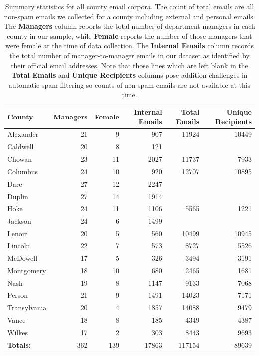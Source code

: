 \documentclass[fleqn]{MJDArticle}
\begin{document}
\begin{table}[ht]
\caption{\label{tab:county email summaries} Summary statistics for all county email corpora. The count of total emails are all non-spam emails we collected for a county including external and personal emails. The \textbf{Managers} column reports the total number of department managers in each county in our sample, while \textbf{Female} reports the number of those managers that were female at the time of data collection. The \textbf{Internal Emails} column records the total number of manager-to-manager emails in our dataset as identified by their official email addresses. Note that those lines which are left blank in the \textbf{Total Emails} and \textbf{Unique Recipients} columns pose addition challenges in automatic spam filtering so counts of non-spam emails are not available at this time.  }
\centering
\begin{tabular}{lrrrrr}
  \hline
 \textbf{County} & \textbf{Managers} & \textbf{Female} & \textbf{Internal Emails} &\textbf{Total Emails} & \textbf{Unique Recipients} \\
  \hline
  \rowcolor{Grey}
Alexander & 21 & 9 & 907 & 11924 & 10449 \\
Caldwell & 20 & 8 & 121 &  &  \\
\rowcolor{Grey}
Chowan & 23 & 11 & 2027 & 11737 & 7933 \\
Columbus & 24 & 10 & 920 & 12707 & 10895 \\
\rowcolor{Grey}
Dare & 27 & 12 & 2247 &  &  \\
Duplin & 27 & 14 & 1914 &  &  \\
\rowcolor{Grey}
Hoke & 24 & 11 & 1106 & 5565 & 1221 \\
Jackson & 24 & 6 & 1499 &  &  \\
\rowcolor{Grey}
Lenoir & 20 & 5 & 560 & 10499 & 10945 \\
Lincoln & 22 & 7 & 573 & 8727 & 5526 \\
\rowcolor{Grey}
McDowell & 17 & 5 & 326 & 3494 & 3191 \\
Montgomery & 18 & 10 & 680 & 2465 & 1681 \\
\rowcolor{Grey}
Nash & 19 & 8 & 1147 & 9133 & 7068 \\
Person & 21 & 9 & 1491 & 14023 & 7171 \\
\rowcolor{Grey}
Transylvania & 20 & 4 & 1857 & 14088 & 9479 \\
Vance & 18 & 8 & 185 & 4349 & 4387 \\
\rowcolor{Grey}
Wilkes & 17 & 2 & 303 & 8443 & 9693 \\
   \hline
   \textbf{Totals:} & 362 & 139 & 17863 & 117154 & 89639 \\
   \hline
\end{tabular}
\end{table}
\end{document}

